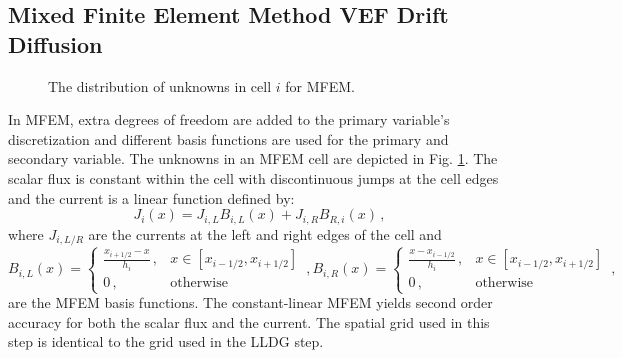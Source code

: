 
\subsection{Mixed Finite Element Method VEF Drift Diffusion}
\begin{figure}
	\centering
	 
	\caption{The distribution of unknowns in cell $i$ for MFEM. }
	\label{fig:mfem_grid}
\end{figure}
In MFEM, extra degrees of freedom are added to the primary variable's discretization and different basis functions are used for the primary and secondary variable. The unknowns in an MFEM cell are depicted in Fig. \ref{fig:mfem_grid}. The scalar flux is constant within the cell with discontinuous jumps at the cell edges and the current is a linear function defined by: 
	\begin{equation} \label{eq:MFEM_current}
		J_i(x) = J_{i,L} B_{i,L}(x) + J_{i,R} B_{R,i}(x) \,, 
	\end{equation} 
where $J_{i,L/R}$ are the currents at the left and right edges of the cell and 
	\begin{subequations}
		\begin{equation}
			B_{i,L}(x) = \begin{cases}
				\frac{x_{i+1/2} - x}{h_i} \,, & x \in [x_{i-1/2}, x_{i+1/2}] \\ 
				0 \,, & \text{otherwise}
			\end{cases} \,,
		\end{equation}
		\begin{equation}
			B_{i,R}(x) = \begin{cases}
				\frac{x - x_{i-1/2}}{h_i} \,, & x \in [x_{i-1/2}, x_{i+1/2}] \\ 
				0 \,, & \text{otherwise}
			\end{cases} \,,
		\end{equation}
	\end{subequations}
are the MFEM basis functions. The constant-linear MFEM yields second order accuracy for both the scalar flux and the current. The spatial grid used in this step is identical to the grid used in the LLDG \SN step. 


